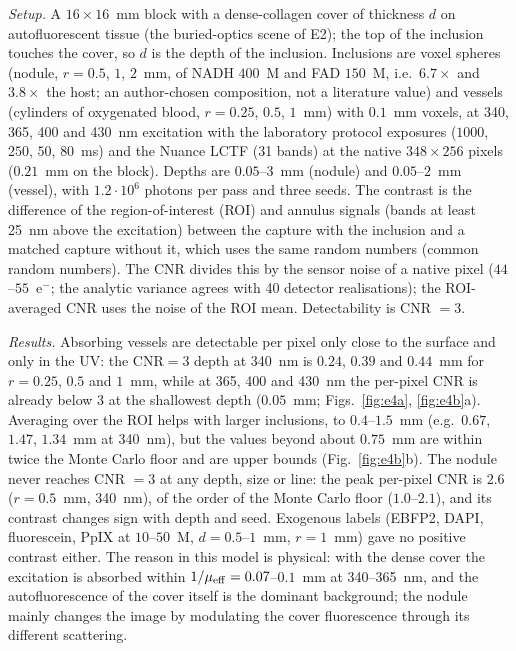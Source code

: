 \documentclass[journal]{IEEEtran}
\begin{document}
\emph{Setup.} A $16\times16$~mm block with a dense-collagen cover of thickness $d$ on autofluorescent tissue (the buried-optics scene of E2); the top of the inclusion touches the cover, so $d$ is the depth of the inclusion. Inclusions are voxel spheres (nodule, $r=0.5$, $1$, $2$~mm, of NADH $400$~\textmu M and FAD $150$~\textmu M, i.e.\ $6.7\times$ and $3.8\times$ the host; an author-chosen composition, not a literature value) and vessels (cylinders of oxygenated blood, $r=0.25$, $0.5$, $1$~mm) with $0.1$~mm voxels, at 340, 365, 400 and 430~nm excitation with the laboratory protocol exposures ($1000$, $250$, $50$, $80$~ms) and the Nuance LCTF (31 bands) at the native $348\times256$ pixels ($0.21$~mm on the block). Depths are $0.05$--$3$~mm (nodule) and $0.05$--$2$~mm (vessel), with $1.2\cdot10^6$ photons per pass and three seeds. The contrast is the difference of the region-of-interest (ROI) and annulus signals (bands at least 25~nm above the excitation) between the capture with the inclusion and a matched capture without it, which uses the same random numbers (common random numbers). The CNR divides this by the sensor noise of a native pixel ($44$--$55$~e$^-$; the analytic variance agrees with 40 detector realisations); the ROI-averaged CNR uses the noise of the ROI mean. Detectability is CNR $=3$.

\emph{Results.} Absorbing vessels are detectable per pixel only close to the surface and only in the UV: the CNR$=3$ depth at 340~nm is $0.24$, $0.39$ and $0.44$~mm for $r=0.25$, $0.5$ and $1$~mm, while at 365, 400 and 430~nm the per-pixel CNR is already below 3 at the shallowest depth ($0.05$~mm; Figs.~\ref{fig:e4a}, \ref{fig:e4b}a). Averaging over the ROI helps with larger inclusions, to $0.4$--$1.5$~mm (e.g.\ $0.67$, $1.47$, $1.34$~mm at 340~nm), but the values beyond about $0.75$~mm are within twice the Monte Carlo floor and are upper bounds (Fig.~\ref{fig:e4b}b). The nodule never reaches CNR $=3$ at any depth, size or line: the peak per-pixel CNR is $2.6$ ($r=0.5$~mm, 340~nm), of the order of the Monte Carlo floor ($1.0$--$2.1$), and its contrast changes sign with depth and seed. Exogenous labels (EBFP2, DAPI, fluorescein, PpIX at $10$--$50$~\textmu M, $d=0.5$--$1$~mm, $r=1$~mm) gave no positive contrast either. The reason in this model is physical: with the dense cover the excitation is absorbed within $1/\mu_{\rm eff}=0.07$--$0.1$~mm at 340--365~nm, and the autofluorescence of the cover itself is the dominant background; the nodule mainly changes the image by modulating the cover fluorescence through its different scattering.
\end{document}
